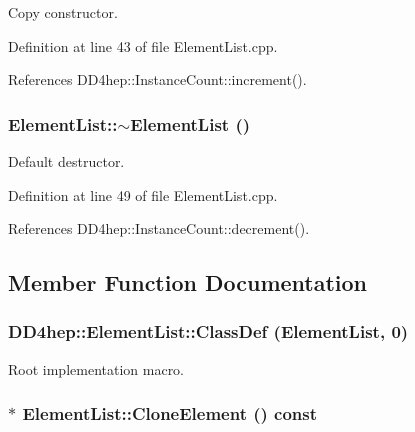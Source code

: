 Copy constructor. 

Definition at line 43 of file ElementList.cpp.

References DD4hep::InstanceCount::increment().\hypertarget{class_d_d4hep_1_1_element_list_a400de029850c5e46b89d0178b0a5f7dc}{
\subsubsection[{$\sim$ElementList}]{\setlength{\rightskip}{0pt plus 5cm}ElementList::$\sim$ElementList ()}}
\label{class_d_d4hep_1_1_element_list_a400de029850c5e46b89d0178b0a5f7dc}


Default destructor. 

Definition at line 49 of file ElementList.cpp.

References DD4hep::InstanceCount::decrement().

\subsection{Member Function Documentation}
\hypertarget{class_d_d4hep_1_1_element_list_a857af85f3fb5d9fd07519c846100f841}{
\subsubsection[{ClassDef}]{\setlength{\rightskip}{0pt plus 5cm}DD4hep::ElementList::ClassDef ({\bf ElementList}, \/  0)}}
\label{class_d_d4hep_1_1_element_list_a857af85f3fb5d9fd07519c846100f841}


Root implementation macro. \hypertarget{class_d_d4hep_1_1_element_list_a74974daa0e5039b255f2fbc78629949d}{
\subsubsection[{CloneElement}]{ $\ast$ ElementList::CloneElement () const}}
\label{class_d_d4hep_1_1_element_list_a74974daa0e5039b255f2fbc78629949d}


